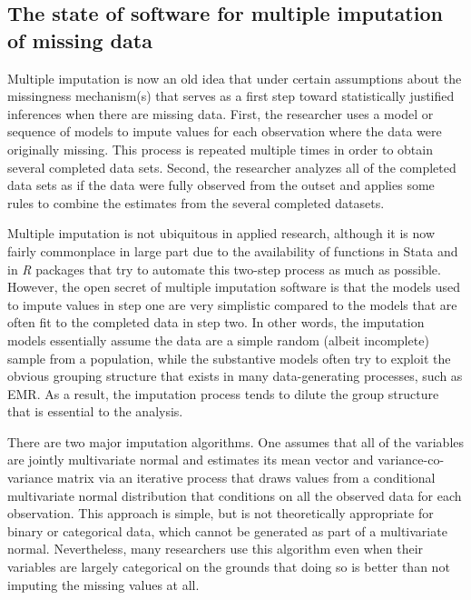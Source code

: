 \documentclass[11pt,notitlepage]{article}
\begin{document}
\subsection*{The state of software for multiple imputation of missing data}

Multiple imputation is now an old idea that under certain assumptions about the missingness 
mechanism(s) that serves as a first step toward statistically justified inferences when there
are missing data. First, the researcher uses a model or sequence of models to impute values for 
each observation where the data were originally missing. This process is repeated multiple times
in order to obtain several completed data sets. Second, the researcher analyzes all of the 
completed data sets as if the data were fully observed from the outset and applies some rules to
combine the estimates from the several completed datasets.

Multiple imputation is not ubiquitous in applied research, although it is now fairly commonplace
in large part due to the availability of functions in Stata and in \textit{R} packages that try
to automate this two-step process as much as possible. However, the open secret of multiple
imputation software is that the models used to impute values in step one are very simplistic
compared to the models that are often fit to the completed data in step two. In other words,
the imputation models essentially assume the data are a simple random (albeit incomplete)
sample from a population, while the substantive models often try to exploit the obvious
grouping structure that exists in many data-generating processes, such as EMR. As a result,
the imputation process tends to dilute the group structure that is essential to the analysis.

There are two major imputation algorithms. One assumes that all of the variables are jointly
multivariate normal and estimates its mean vector and variance-co-variance matrix via an
iterative process that draws values from a conditional multivariate normal distribution that
conditions on all the observed data for each observation. This approach is simple, but is 
not theoretically appropriate for binary or categorical data, which cannot be generated as
part of a multivariate normal. Nevertheless, many researchers use this algorithm even when
their variables are largely categorical on the grounds that doing so is better than not
imputing the missing values at all.
\end{document}
